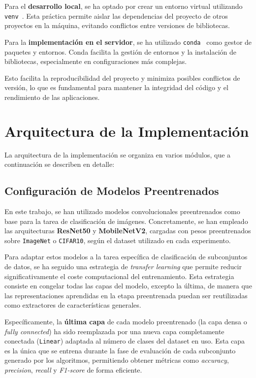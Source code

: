 Para el \textbf{desarrollo local}, se ha optado por crear un entorno virtual utilizando
\texttt{venv}~\cite{CreationVirtualEnvironments}.
Esta práctica permite aislar las dependencias del proyecto de otros proyectos en la máquina, evitando conflictos entre
versiones de bibliotecas.


Para la \textbf{implementación en el servidor}, se ha utilizado \texttt{conda}~\cite{CondaDocumentation} como gestor
de paquetes y entornos.
Conda facilita la gestión de entornos y la instalación de bibliotecas, especialmente en configuraciones más complejas.



Esto facilita la reproducibilidad del proyecto y minimiza posibles conflictos de versión, lo que es fundamental para
mantener la integridad del código y el rendimiento de las aplicaciones.

\section{Arquitectura de la Implementación}\label{sec:arquitectura-de-la-implementacion}
La arquitectura de la implementación se organiza en varios módulos, que a continuación se describen en detalle:

\subsection{Configuración de Modelos Preentrenados}\label{subsec:configuracion-modelos-preentrenados}
En este trabajo, se han utilizado modelos convolucionales preentrenados como base para la tarea de clasificación de imágenes.
Concretamente, se han empleado las arquitecturas \textbf{ResNet50} y \textbf{MobileNetV2},
cargadas con pesos preentrenados sobre \texttt{ImageNet} o \texttt{CIFAR10}, según el dataset utilizado en cada experimento.

Para adaptar estos modelos a la tarea específica de clasificación de subconjuntos de datos,
se ha seguido una estrategia de \textit{transfer learning} que permite reducir significativamente el coste computacional del entrenamiento.
Esta estrategia consiste en congelar todas las capas del modelo, excepto la última,
de manera que las representaciones aprendidas en la etapa preentrenada puedan ser reutilizadas como extractores de características generales.

Específicamente, la \textbf{última capa} de cada modelo preentrenado (la capa densa o \textit{fully connected})
ha sido reemplazada por una nueva capa completamente conectada (\texttt{Linear}) adaptada al número de clases del dataset en uso.
Esta capa es la única que se entrena durante la fase de evaluación de cada subconjunto generado por los algoritmos,
permitiendo obtener métricas como \textit{accuracy}, \textit{precision}, \textit{recall} y \textit{F1-score} de forma eficiente.

